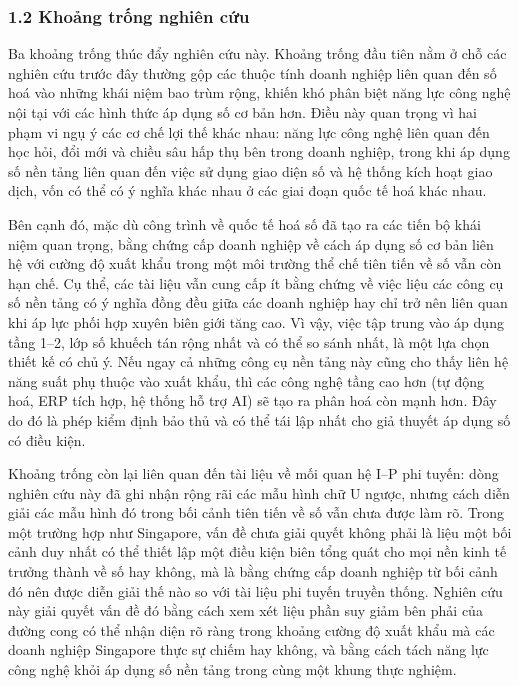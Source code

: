 \documentclass[12pt,a4paper]{article}
\begin{document}
\hypertarget{12-khoux1ea3ng-trux1ed1ng-nghiuxean-cux1ee9u}{%
\subsubsection{1.2 Khoảng trống nghiên
cứu}\label{12-khoux1ea3ng-trux1ed1ng-nghiuxean-cux1ee9u}}

Ba khoảng trống thúc đẩy nghiên cứu này. Khoảng trống đầu tiên nằm ở chỗ
các nghiên cứu trước đây thường gộp các thuộc tính doanh nghiệp liên
quan đến số hoá vào những khái niệm bao trùm rộng, khiến khó phân biệt
năng lực công nghệ nội tại với các hình thức áp dụng số cơ bản hơn. Điều
này quan trọng vì hai phạm vi ngụ ý các cơ chế lợi thế khác nhau: năng
lực công nghệ liên quan đến học hỏi, đổi mới và chiều sâu hấp thụ bên
trong doanh nghiệp, trong khi áp dụng số nền tảng liên quan đến việc sử
dụng giao diện số và hệ thống kích hoạt giao dịch, vốn có thể có ý nghĩa
khác nhau ở các giai đoạn quốc tế hoá khác nhau.

Bên cạnh đó, mặc dù công trình về quốc tế hoá số đã tạo ra các tiến bộ
khái niệm quan trọng, bằng chứng cấp doanh nghiệp về cách áp dụng số cơ
bản liên hệ với cường độ xuất khẩu trong một môi trường thể chế tiên
tiến về số vẫn còn hạn chế. Cụ thể, các tài liệu vẫn cung cấp ít bằng
chứng về việc liệu các công cụ số nền tảng có ý nghĩa đồng đều giữa các
doanh nghiệp hay chỉ trở nên liên quan khi áp lực phối hợp xuyên biên
giới tăng cao. Vì vậy, việc tập trung vào áp dụng tầng 1--2, lớp số
khuếch tán rộng nhất và có thể so sánh nhất, là một lựa chọn thiết kế có
chủ ý. Nếu ngay cả những công cụ nền tảng này cũng cho thấy liên hệ năng
suất phụ thuộc vào xuất khẩu, thì các công nghệ tầng cao hơn (tự động
hoá, ERP tích hợp, hệ thống hỗ trợ AI) sẽ tạo ra phân hoá còn mạnh hơn.
Đây do đó là phép kiểm định bảo thủ và có thể tái lập nhất cho giả
thuyết áp dụng số có điều kiện.

Khoảng trống còn lại liên quan đến tài liệu về mối quan hệ I--P phi
tuyến: dòng nghiên cứu này đã ghi nhận rộng rãi các mẫu hình chữ U
ngược, nhưng cách diễn giải các mẫu hình đó trong bối cảnh tiên tiến về
số vẫn chưa được làm rõ. Trong một trường hợp như Singapore, vấn đề chưa
giải quyết không phải là liệu một bối cảnh duy nhất có thể thiết lập một
điều kiện biên tổng quát cho mọi nền kinh tế trưởng thành về số hay
không, mà là bằng chứng cấp doanh nghiệp từ bối cảnh đó nên được diễn
giải thế nào so với tài liệu phi tuyến truyền thống. Nghiên cứu này giải
quyết vấn đề đó bằng cách xem xét liệu phần suy giảm bên phải của đường
cong có thể nhận diện rõ ràng trong khoảng cường độ xuất khẩu mà các
doanh nghiệp Singapore thực sự chiếm hay không, và bằng cách tách năng
lực công nghệ khỏi áp dụng số nền tảng trong cùng một khung thực nghiệm.
\end{document}
